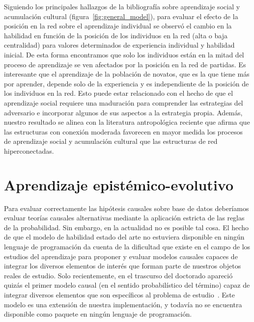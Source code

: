 \documentclass[a4paper,11pt]{book}
\theoremstyle{definition}
\begin{document}

Siguiendo los principales hallazgos de la bibliograf\'ia sobre aprendizaje social y acumulaci\'on cultural (figura~\ref{fig:general_model}), para evaluar el efecto de la posici\'on en la red sobre el aprendizaje individual se observ\'o el cambio en la habilidad en funci\'on de la posici\'on de los individuos en la red (alta o baja centralidad) para valores determinados de experiencia individual y habilidad inicial.
%
De esta forma encontramos que solo los individuos est\'an en la mitad del proceso de aprendizaje se ven afectados por la posici\'on en la red de partidas.
%
Es interesante que el aprendizaje de la poblaci\'on de novatos, que es la
que tiene m\'as por aprender, depende solo de la experiencia y es independiente de la posici\'on de los individuos en la red.
%
Esto puede estar relacionado con el hecho de que el aprendizaje social requiere una maduraci\'on para comprender las estrategias del adversario e incorporar algunos de sus aspectos a la estrategia propia.
%
Adem\'as, nuestro resultado se alinea con la literatura antropol\'ogica reciente que afirma que las estructuras con conexi\'on moderada favorecen en mayor medida los procesos de aprendizaje social y acumulaci\'on cultural que las estructuras de red hiperconectadas.

\section{Aprendizaje epist\'emico-evolutivo}

Para evaluar correctamente las hip\'otesis causales sobre base de datos deber\'iamos evaluar teor\'ias causales alternativas mediante la aplicaci\'on estricta de las reglas de la probabilidad.
%
Sin embargo, en la actualidad no es posible tal cosa.
%
El hecho de que el modelo de habilidad estado del arte no estuviera disponible en ning\'un lenguaje de programaci\'on da cuenta de la dificultad que existe en el campo de los estudios del aprendizaje para proponer y evaluar modelos causales capaces de integrar los diversos elementos de inter\'es que forman parte de nuestros objetos reales de estudio.
%
Solo recientemente, en el trascurso del doctorado apareci\'o quiz\'as el primer modelo causal (en el sentido probabil\'istico del t\'ermino) capaz de integrar diversos elementos que son espec\'ificos al problema de estudio~\cite{minka2018-trueskill2}.
%
Este modelo es una extensi\'on de nuestra implementaci\'on, y todav\'ia no se encuentra disponible como paquete en ning\'un lenguaje de programaci\'on.
\end{document}
